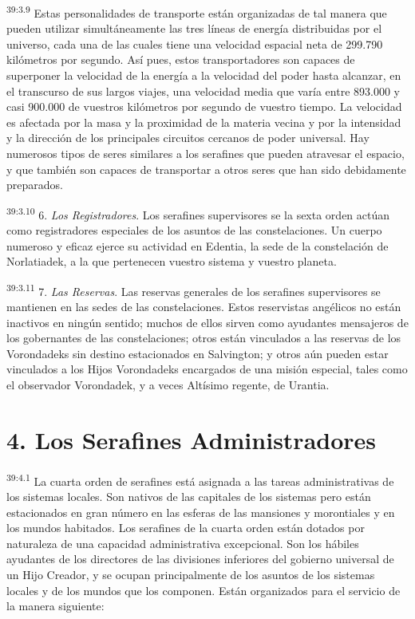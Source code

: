 \par
\textsuperscript{39:3.9} Estas personalidades de transporte están organizadas de tal manera que pueden utilizar simultáneamente las tres líneas de energía distribuidas por el universo, cada una de las cuales tiene una velocidad espacial neta de 299.790 kilómetros por segundo. Así pues, estos transportadores son capaces de superponer la velocidad de la energía a la velocidad del poder hasta alcanzar, en el transcurso de sus largos viajes, una velocidad media que varía entre 893.000 y casi 900.000 de vuestros kilómetros por segundo de vuestro tiempo. La velocidad es afectada por la masa y la proximidad de la materia vecina y por la intensidad y la dirección de los principales circuitos cercanos de poder universal. Hay numerosos tipos de seres similares a los serafines que pueden atravesar el espacio, y que también son capaces de transportar a otros seres que han sido debidamente preparados.

\par
\textsuperscript{39:3.10} 6. \textit{Los Registradores}. Los serafines supervisores se la sexta orden actúan como registradores especiales de los asuntos de las constelaciones. Un cuerpo numeroso y eficaz ejerce su actividad en Edentia, la sede de la constelación de Norlatiadek, a la que pertenecen vuestro sistema y vuestro planeta.

\par
\textsuperscript{39:3.11} 7. \textit{Las Reservas}. Las reservas generales de los serafines supervisores se mantienen en las sedes de las constelaciones. Estos reservistas angélicos no están inactivos en ningún sentido; muchos de ellos sirven como ayudantes mensajeros de los gobernantes de las constelaciones; otros están vinculados a las reservas de los Vorondadeks sin destino estacionados en Salvington; y otros aún pueden estar vinculados a los Hijos Vorondadeks encargados de una misión especial, tales como el observador Vorondadek, y a veces Altísimo regente, de Urantia.

\section*{4. Los Serafines Administradores}
\par
\textsuperscript{39:4.1} La cuarta orden de serafines está asignada a las tareas administrativas de los sistemas locales. Son nativos de las capitales de los sistemas pero están estacionados en gran número en las esferas de las mansiones y morontiales y en los mundos habitados. Los serafines de la cuarta orden están dotados por naturaleza de una capacidad administrativa excepcional. Son los hábiles ayudantes de los directores de las divisiones inferiores del gobierno universal de un Hijo Creador, y se ocupan principalmente de los asuntos de los sistemas locales y de los mundos que los componen. Están organizados para el servicio de la manera siguiente:

